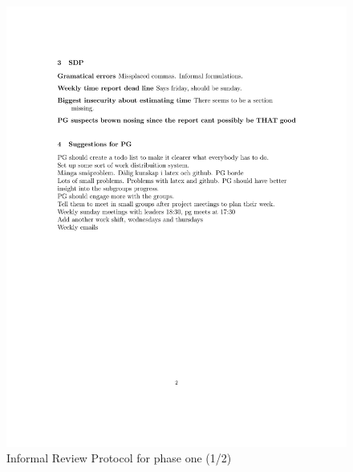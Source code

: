 \documentclass{article}
\begin{document}
 
 \begin{figure}
     \centering
     \includegraphics[width=13cm]{images/Phase1_2021_02_03-2}
     \renewcommand\figurename{Figure}
      \caption{Informal Review Protocol for phase one (1/2)}
     \label{fig:my_label}
 \end{figure}
\end{document}
